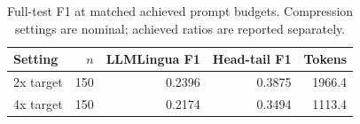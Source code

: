 \begin{table}[t]
\centering
\small
\setlength{\tabcolsep}{3pt}
\begin{tabular}{lrrrr}
\hline
Setting & $n$ & LLMLingua F1 & Head-tail F1 & Tokens \\
\hline
2x target & 150 & 0.2396 & 0.3875 & 1966.4 \\
4x target & 150 & 0.2174 & 0.3494 & 1113.4 \\
\hline
\end{tabular}
\caption{Full-test F1 at matched achieved prompt budgets. Compression settings are nominal; achieved ratios are reported separately.}
\label{tab:author-matched-budget}
\end{table}
